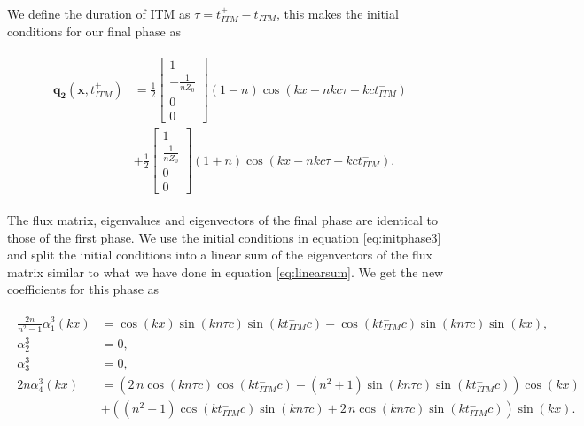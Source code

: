 We define the duration of \ac{ITM} as $\tau = t_{ITM}^+ - t_{ITM}^-$, this makes the initial conditions for our final phase as

\begin{align}
    \begin{split}
        \mathbf{q_2}\left(\mathbf{x}, t_{ITM}^+\right) &= 
        \frac{1}{2} \begin{bmatrix}
            1 \\
            -\frac{1}{nZ_0} \\
            0 \\
            0
        \end{bmatrix} \left(1 - n\right) \cos\left(kx +nk c \tau - k c t_{ITM}^-\right) \\ 
        &+ \frac{1}{2} 
        \begin{bmatrix}
            1 \\
            \frac{1}{nZ_0} \\
            0 \\
            0
        \end{bmatrix} \left(1 + n\right) \cos\left(kx - nk c \tau - k c t_{ITM}^-\right) .
    \end{split}
    \label{eq:initphase3}
\end{align}

The flux matrix, eigenvalues and eigenvectors of the final phase are identical to those of the first phase. We use the initial conditions in equation \ref{eq:initphase3}
and split the initial conditions into a linear sum of the eigenvectors of the flux matrix similar to what we have done in equation \ref{eq:linearsum}. 
We get the new coefficients for this phase as

\begin{align}
    \begin{split}
        \frac{2n}{n^2 - 1} \alpha_1^3\left(kx\right) &=  {\cos\left(k x\right) \sin\left(k n \tau c\right) \sin\left(k \mathit{t_{ITM}^-} c\right) - \cos\left(k \mathit{t_{ITM}^-} c\right) \sin\left(k n \tau c\right) \sin\left(k x\right)}, \\
        \alpha_2^3 &= 0, \\
        \alpha_3^3 &= 0, \\
        {2n} \alpha_4^3 \left(kx\right) &= {\left(2 \, n \cos\left(k n \tau c\right) \cos\left(k \mathit{t_{ITM}^-} c\right) - {\left(n^{2} + 1\right)} \sin\left(k n \tau c\right) \sin\left(k \mathit{t_{ITM}^-} c\right)\right)} \cos\left(k x\right) \\
        &+ {\left({\left(n^{2} + 1\right)} \cos\left(k \mathit{t_{ITM}^-} c\right) \sin\left(k n \tau c\right) + 2 \, n \cos\left(k n \tau c\right) \sin\left(k \mathit{t_{ITM}^-} c\right)\right)} \sin\left(k x\right) .
    \end{split}
\end{align}

